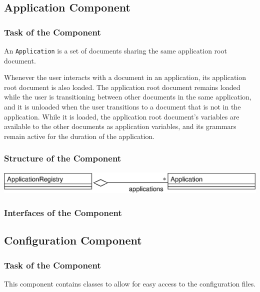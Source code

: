 \documentclass[11pt,a4paper]{article}
\begin{document}
\subsection{Application Component}

\subsubsection{Task of the Component}

An \texttt{Application} is a set of documents sharing the same 
application root document.

Whenever the user interacts with a document in an application, its
application root document is also loaded. The application root document
remains loaded while the user is transitioning between other documents in the
same application, and it is unloaded when the user transitions to a document
that is not in the application. While it is loaded, the application root
document's variables are available to the other documents as application
variables, and its grammars remain active for the duration of the
application.

\subsubsection{Structure of the Component}

\begin{center}
\includegraphics[scale=0.6]{class-application.eps}
\end{center}

\subsubsection{Interfaces of the Component}

\subsection{Configuration Component}
\label{sec:conf-comp}

\subsubsection{Task of the Component}

This component contains classes to allow for easy access to the configuration
files.
\end{document}
